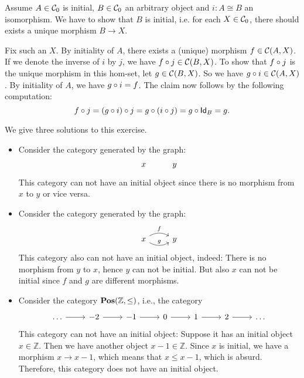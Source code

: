 \begin{solution}\label{sol:initiality_preserved_by_iso}
Assume $A\in \Ob{\CC}$ is initial, $B\in\Ob{\CC}$ an arbitrary object and $i:A\cong B$ an isomorphism. We have to show that $B$ is initial, i.e. for each $X\in\Ob{\CC}$, there should exists a unique morphism $B\to X$.

Fix such an $X$. By initiality of $A$, there exists a (unique) morphism $f\in \CHom{\CC}{A}{X}$. If we denote the inverse of $i$ by $j$, we have $\co{j}{f} \in\CHom{\CC}{B}{X}$. To show that $\co{j}{f}$ is the unique morphism in this hom-set, let $g\in \CHom{\CC}{B}{X}$. So we have $\co{i}{g} \in \CHom{\CC}{A}{X}$. By initiality of $A$, we have $\co{i}{g} = f$. The claim now follows by the following computation:
\[
\co{j}{f} = \co{j}{(\co{i}{g})} = \co{(\co{j}{i})}{g} = \co{\Id[B]}{g} = g.
\]
\end{solution}

\begin{solution}\label{sol:cat-without-initial}
We give three solutions to this exercise.
\begin{itemize}
\item Consider the category generated by the graph: 
\[
\begin{tikzcd}
x & y
\end{tikzcd}
\]
This category can not have an initial object since there is no morphism from $x$ to $y$ or vice versa.
\item Consider the category generated by the graph: 
\[
\begin{tikzcd}
x \arrow[r, bend left, "f"] \arrow[r, bend right, "g"] & y
\end{tikzcd}
\]
This category also can not have an initial object, indeed: There is no morphism from $y$ to $x$, hence $y$ can not be initial. But also $x$ can not be initial since $f$ and $g$ are different morphisms.
\item Consider the category $ \POS(\mathbb Z, \leq) $, i.e., the category
\[
\begin{tikzcd}
	\dots \arrow[r] & -2 \arrow[r] & -1 \arrow[r] & 0 \arrow[r] & 1 \arrow[r] & 2 \arrow[r] & \dots
\end{tikzcd}
\]
This category can not have an initial object: Suppose it has an initial object $ x \in \mathbb Z $. Then we have another object $ x - 1 \in \mathbb Z $. Since $ x $ is initial, we have a morphism $ x \to x - 1 $, which means that $ x \leq x - 1 $, which is absurd. Therefore, this category does not have an initial object.
\end{itemize}
\end{solution}

